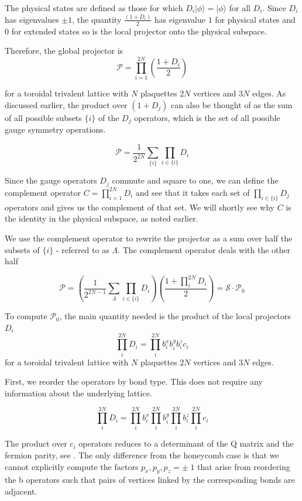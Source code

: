 The physical states are defined as those for which \(D_i |\phi\rangle = |\phi\rangle\) for all \(D_i\). Since \(D_i\) has eigenvalues \(\pm1\), the quantity \(\tfrac{(1+D_i)}{2}\) has eigenvalue \(1\) for physical states and \(0\) for extended states so is the local projector onto the physical subspace.

Therefore, the global projector is \[ \mathcal{P} = \prod_{i=1}^{2N} \left( \frac{1 + D_i}{2}\right)\]

for a toroidal trivalent lattice with \(N\) plaquettes \(2N\) vertices and \(3N\) edges. As discussed earlier, the product over \((1 + D_j)\) can also be thought of as the sum of all possible subsets \(\{i\}\) of the \(D_j\) operators, which is the set of all possible gauge symmetry operations.

\[ \mathcal{P} = \frac{1}{2^{2N}} \sum_{\{i\}} \prod_{i\in\{i\}} D_i\]

Since the gauge operators \(D_j\) commute and square to one, we can define the complement operator \(C = \prod_{i=1}^{2N} D_i\) and see that it takes each set of \(\prod_{i \in \{i\}} D_j\) operators and gives us the complement of that set. We will shortly see why \(C\) is the identity in the physical subspace, as noted earlier.

We use the complement operator to rewrite the projector as a sum over half the subsets of \(\{i\}\) - referred to as \(\Lambda\). The complement operator deals with the other half

\[ \mathcal{P} =  \left( \frac{1}{2^{2N-1}} \sum_{\Lambda} \prod_{i\in\{i\}} D_i\right) \left(\frac{1 + \prod_i^{2N} D_i}{2}\right) = \mathcal{S} \cdot \mathcal{P}_0\]

To compute \(\mathcal{P}_0\), the main quantity needed is the product of the local projectors \(D_i\) \[\prod_i^{2N} D_i = \prod_i^{2N} b^x_i b^y_i b^z_i c_i \] for a toroidal trivalent lattice with \(N\) plaquettes \(2N\) vertices and \(3N\) edges.

First, we reorder the operators by bond type. This does not require any information about the underlying lattice.

\[\prod_i^{2N} D_i = \prod_i^{2N} b^x_i \prod_i^{2N} b^y_i \prod_i^{2N} b^z_i \prod_i^{2N} c_i\]

The product over \(c_i\) operators reduces to a determinant of the Q matrix and the fermion parity, see \textcite{pedrocchiPhysicalSolutionsKitaev2011b}. The only difference from the honeycomb case is that we cannot explicitly compute the factors \(p_x,p_y,p_z = \pm\;1\) that arise from reordering the b operators such that pairs of vertices linked by the corresponding bonds are adjacent.

